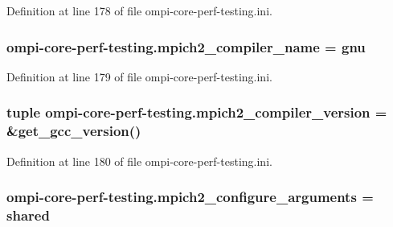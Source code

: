 Definition at line 178 of file ompi-\/core-\/perf-\/testing.\-ini.

\hypertarget{namespaceompi-core-perf-testing_a514348840ab2f20da080b7ea0d9b7f73}{
\subsubsection[{mpich2\-\_\-compiler\-\_\-name}]{\setlength{\rightskip}{0pt plus 5cm}ompi-\/core-\/perf-\/testing.\-mpich2\-\_\-compiler\-\_\-name = gnu}}\label{namespaceompi-core-perf-testing_a514348840ab2f20da080b7ea0d9b7f73}


Definition at line 179 of file ompi-\/core-\/perf-\/testing.\-ini.

\hypertarget{namespaceompi-core-perf-testing_a8bf80d7842612f727f0c9d47f51407e5}{
\subsubsection[{mpich2\-\_\-compiler\-\_\-version}]{\setlength{\rightskip}{0pt plus 5cm}tuple ompi-\/core-\/perf-\/testing.\-mpich2\-\_\-compiler\-\_\-version = \&get\-\_\-gcc\-\_\-version()}}\label{namespaceompi-core-perf-testing_a8bf80d7842612f727f0c9d47f51407e5}


Definition at line 180 of file ompi-\/core-\/perf-\/testing.\-ini.

\hypertarget{namespaceompi-core-perf-testing_a7215b7a4babaf7f8f2c9f588168f9b18}{
\subsubsection[{mpich2\-\_\-configure\-\_\-arguments}]{\setlength{\rightskip}{0pt plus 5cm}ompi-\/core-\/perf-\/testing.\-mpich2\-\_\-configure\-\_\-arguments = shared}}\label{namespaceompi-core-perf-testing_a7215b7a4babaf7f8f2c9f588168f9b18}


